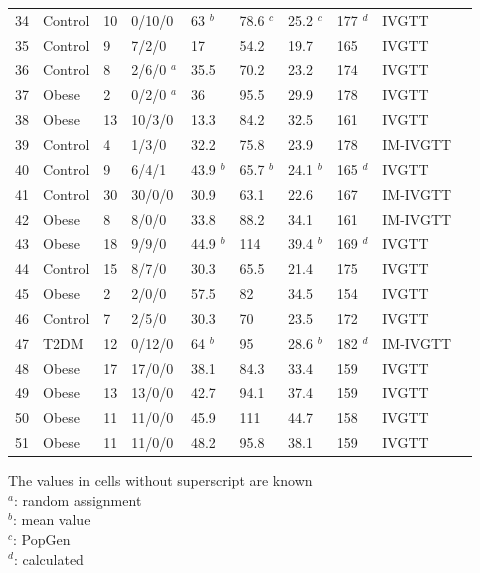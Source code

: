 \documentclass[utf8]{frontiersSCNS} %
\begin{document}
\begin{table}[h]
{\begin{tabular}{llllllllll}
34 & Control & 10 & 0/10/0  & 63 $^b$   & 78.6 $^c$ & 25.2 $^c$ & 177 $^d$ & IVGTT    & \cite{1998_AGING_Ahren}         \\
35 & Control & 9  & 7/2/0   & 17     & 54.2    & 19.7   & 165   & IVGTT    & \cite{pagano_1995}                      \\
36 & Control & 8  & 2/6/0 $^a$ & 35.5   & 70.2    & 23.2   & 174   & IVGTT    & \cite{2001_MyocInfarct_Cavallo} \\
37 & Obese   & 2  & 0/2/0 $^a$ & 36     & 95.5    & 29.9   & 178   & IVGTT    & \cite{2001_MyocInfarct_Cavallo} \\
38 & Obese   & 13 & 10/3/0  & 13.3   & 84.2    & 32.5   & 161   & IVGTT    & \cite{Cerutti1998}                      \\
39 & Control & 4  & 1/3/0   & 32.2   & 75.8    & 23.9   & 178   & IM-IVGTT & \cite{2002_AGENESIS_Roden}      \\
40 &
  Control &
  9 &
  6/4/1 &
  43.9 $^b$ &
  65.7 $^b$ &
  24.1 $^b$ &
  165 $^d$ &
  IVGTT &
  \cite{2008_hanisurya_thyroid} \\
41 & Control & 30 & 30/0/0  & 30.9   & 63.1    & 22.6   & 167   & IM-IVGTT & \cite{2012_pGDM_tura}           \\
42 & Obese   & 8  & 8/0/0   & 33.8   & 88.2    & 34.1   & 161   & IM-IVGTT & \cite{2012_pGDM_tura}           \\
43 & Obese   & 18 & 9/9/0   & 44.9 $^b$ & 114     & 39.4 $^b$ & 169 $^d$ & IVGTT    & \cite{Kautzky-Willer1992}                      \\
44 & Control & 15 & 8/7/0   & 30.3   & 65.5    & 21.4   & 175   & IVGTT    & \cite{Kautzky-Willer1992}                      \\
45 & Obese   & 2  & 2/0/0   & 57.5   & 82      & 34.5   & 154   & IVGTT    & \cite{Kautzky-Willer1992}                      \\
46 & Control & 7  & 2/5/0   & 30.3   & 70      & 23.5   & 172   & IVGTT    & \cite{alex_1996}                     \\
47 & T2DM    & 12 & 0/12/0  & 64 $^b$   & 95      & 28.6 $^b$ & 182 $^d$ & IM-IVGTT & \cite{2010_alcohol_ludvik}      \\
48 & Obese   & 17 & 17/0/0  & 38.1   & 84.3    & 33.4   & 159   & IVGTT    & \cite{2006_Davi_JACC}           \\
49 & Obese   & 13 & 13/0/0  & 42.7   & 94.1    & 37.4   & 159   & IVGTT    & \cite{2006_Davi_JACC}           \\
50 & Obese   & 11 & 11/0/0  & 45.9   & 111     & 44.7   & 158   & IVGTT    & \cite{2003_INFLAMMATORY_Davi}   \\
51 & Obese   & 11 & 11/0/0  & 48.2   & 95.8    & 38.1   & 159   & IVGTT    & \cite{2003_INFLAMMATORY_Davi}  \\ \hline
\end{tabular}}
The values in cells without superscript are known \\ 
$^a$: random assignment \\
$^b$: mean value \\
$^c$: PopGen \\
$^d$: calculated \\
\end{table}
\end{document}
